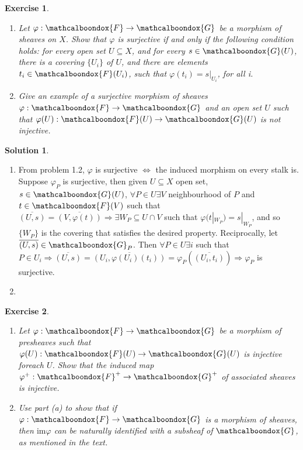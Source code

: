 \documentclass[12pt]{article}
\newcommand{\imp}{\ensuremath{\Rightarrow}}
\newcommand{\ima}{\ensuremath{\mathrm{im}}}
\newtheorem{ex}{Exercise}[section]
\theoremstyle{definition}
\newtheorem*{sol}{Solution}
\newcommand{\sF}{\ensuremath{\mathcalboondox{F}}}
\newcommand{\sG}{\ensuremath{\mathcalboondox{G}}}
\begin{document}
\begin{ex}
	\begin{enumerate}[label=\alph*)]
		\item Let $\varphi: \sF \to \sG$ be a morphism of sheaves on $X$. Show that $\varphi$ is surjective if and only if the following condition holds: for every open set $U \subseteq X$, and for every $s \in \sG(U)$, there is a covering $\{U_i\}$ of $U$, and there are elements $t_i \in \sF(U_i)$, such that $\varphi(t_i) = s|_{U_i}$, for all i.

		\item Give an example of a surjective morphism of sheaves $\varphi: \sF \to \sG$ and an open set $U$ such that $\varphi(U): \sF(U) \to \sG(U)$ is not injective.
	\end{enumerate}
\end{ex}

\begin{sol}
	\begin{enumerate}[label=\alph*)]
		\item From problem 1.2, $\varphi$ is surjective $\iff$ the induced morphism on every stalk is. Suppose $\varphi_P$ is surjective, then given $U \subseteq X$ open set, $s \in \sG(U)$, $\forall P \in U \exists V$ neighbourhood of $P$ and $t \in \sF(V)$ such that $\overline{(U,s)} = \overline{(V,\varphi(t))} \imp \exists W_P \subseteq U \cap V$ such that $\varphi(t|_{W_P}) = s|_{W_P}$, and so $\{W_P\}$ is the covering that satisfies the desired property. Reciprocally, let $\overline{(U,s)} \in \sG_P$. Then $\forall P \in U \exists i$ such that $P \in U_i \imp \overline{(U,s)} = \overline{(U_i, \varphi(U_i)(t_i))} = \varphi_P(\overline{(U_i, t_i)}) \imp \varphi_P$ is surjective.

		\item
	\end{enumerate}
\end{sol}

\begin{ex}
	\begin{enumerate}[label=\alph*)]
		\item Let $\varphi: \sF \to \sG$ be a morphism of presheaves such that $\varphi(U): \sF(U) \to \sG(U)$ is injective foreach $U$. Show that the induced map $\varphi^{+}: \sF^{+} \to \sG^{+}$ of associated sheaves is injective.

		\item Use part (a) to show that if $\varphi: \sF \to \sG$ is a morphism of sheaves, then $\ima \varphi$ can be naturally identified with a subsheaf of $\sG$, as mentioned in the text.
	\end{enumerate}
\end{ex}
\end{document}
